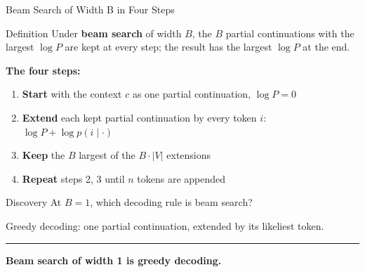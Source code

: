 \documentclass[8pt,aspectratio=169]{beamer}
\newcommand{\bottomnote}[1]{%
\vfill\vspace{-2mm}
\textcolor{mllavender2}{\rule{\textwidth}{0.4pt}}
\vspace{1mm}\footnotesize\textbf{#1}}
\newcommand{\compactlist}{%
\setlength{\itemsep}{0pt}%
\setlength{\parskip}{0pt}%
\setlength{\parsep}{0pt}}
\begin{document}
\begin{frame}[t]{Beam Search of Width B in Four Steps}
\begin{block}{Definition}
Under \textbf{beam search} of width $B$, the $B$ partial continuations with the largest $\log P$ are kept at every step; the result has the largest $\log P$ at the end.
\end{block}

\vspace{2mm}
\textbf{The four steps:}
\begin{enumerate}\compactlist
\item \textbf{Start} with the context $c$ as one partial continuation, $\log P = 0$
\item \textbf{Extend} each kept partial continuation by every token $i$: $\log P + \log p(i \mid \cdot)$
\item \textbf{Keep} the $B$ largest of the $B \cdot |V|$ extensions
\item \textbf{Repeat} steps 2, 3 until $n$ tokens are appended
\end{enumerate}

\vspace{3mm}
\begin{block}{Discovery}
At $B = 1$, which decoding rule is beam search?
\pause

Greedy decoding: one partial continuation, extended by its likeliest token.
\end{block}

\bottomnote{Beam search of width 1 is greedy decoding.}
\end{frame}
\end{document}
